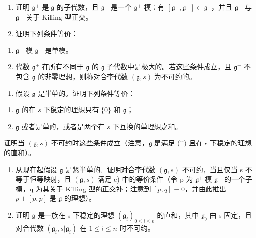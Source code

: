 \begin{enumerate}
\def\labelenumi{\alph{enumi})}
\item
  证明 \(\mathfrak{g}^{+}\) 是 \(\mathfrak{g}\) 的子代数，且 \(\mathfrak{g}^{-}\) 是一个 \(\mathfrak{g}^{+}\)-模；有 \([\mathfrak{g}^{-},\mathfrak{g}^{-}] \subset \mathfrak{g}^{+}\)，并且 \(\mathfrak{g}^{+}\) 与 \(\mathfrak{g}^{-}\) 关于 Killing 型正交。
\item
  证明下列条件等价：
\end{enumerate}

\begin{enumerate}
\def\labelenumi{(\roman{enumi})}
\item
  \(\mathfrak{g}^{+}\)-模 \(\mathfrak{g}^{-}\) 是单模。
\item
  代数 \(\mathfrak{g}^{+}\) 在所有不同于 \(\mathfrak{g}\) 的 \(\mathfrak{g}\) 子代数中是极大的。若这些条件成立，且 \(\mathfrak{g}^{+}\) 不包含 \(\mathfrak{g}\) 的非零理想，则称对合李代数 \((\mathfrak{g}, s)\) 为不可约的。
\end{enumerate}

\begin{enumerate}
\def\labelenumi{\alph{enumi})}
\setcounter{enumi}{2}
\tightlist
\item
  假设 \(\mathfrak{g}\) 是半单的。证明下列条件等价：
\end{enumerate}

\begin{enumerate}
\def\labelenumi{(\roman{enumi})}
\item
  \(\mathfrak{g}\) 的在 \(s\) 下稳定的理想只有 \(\{0\}\) 和 \(\mathfrak{g}\)；
\item
  \(\mathfrak{g}\) 或者是单的，或者是两个在 \(s\) 下互换的单理想之和。
\end{enumerate}

证明当 \((\mathfrak{g}, s)\) 不可约时这些条件成立（注意，\(\mathfrak{g}\) 是满足 (ii) 且在 s 下稳定的理想的直和）。

\begin{enumerate}
\def\labelenumi{\alph{enumi})}
\setcounter{enumi}{3}
\item
  从现在起假设 \(\mathfrak{g}\) 是紧半单的。证明对合李代数 \((\mathfrak{g}, s)\) 不可约，当且仅当 s 不等于恒等映射，且 \((\mathfrak{g}, s)\) 满足 c) 中的等价条件（令 p 为 \(\mathfrak{g}^{+}\)-模 \(\mathfrak{g}^{-}\) 的一个子模，q 为其关于 Killing 型的正交补；注意到 \([p, q] = 0\)，并由此推出 \(p + [p, p]\) 是 \(\mathfrak{g}\) 的理想）。
\item
  证明 \(\mathfrak{g}\) 是一族在 s 下稳定的理想 \((\mathfrak{g}_{i})_{0\leq i\leq n}\) 的直和，其中 \(\mathfrak{g}_{0}\) 由 s 固定，且对合代数 \((\mathfrak{g}_{i},s|\mathfrak{g}_{i})\) 在 \(1\leq i\leq n\) 时不可约。
\end{enumerate}

